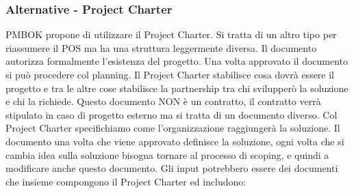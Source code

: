 \subsubsection{Alternative - Project Charter}
PMBOK propone di utilizzare il Project Charter. Si tratta di un altro tipo per riassumere il POS ma ha una struttura leggermente diversa. Il documento autorizza formalmente l'esistenza del progetto. Una volta approvato il documento si può procedere col planning.
Il Project Charter stabilisce cosa dovrà essere il progetto e tra le altre cose stabilisce la partnership tra chi svilupperò la soluzione e chi la richiede.
Questo documento NON è un contratto, il contratto verrà stipulato in caso di progetto esterno ma si tratta di un documento diverso. Col Project Charter specifichiamo come l'organizzazione raggiungerà la soluzione. Il documento una volta che viene approvato definisce la soluzione, ogni volta che si cambia idea sulla soluzione bisogna tornare al processo di scoping, e quindi a modificare anche questo documento.
Gli input potrebbero essere dei documenti che insieme compongono il Project Charter ed includono:
